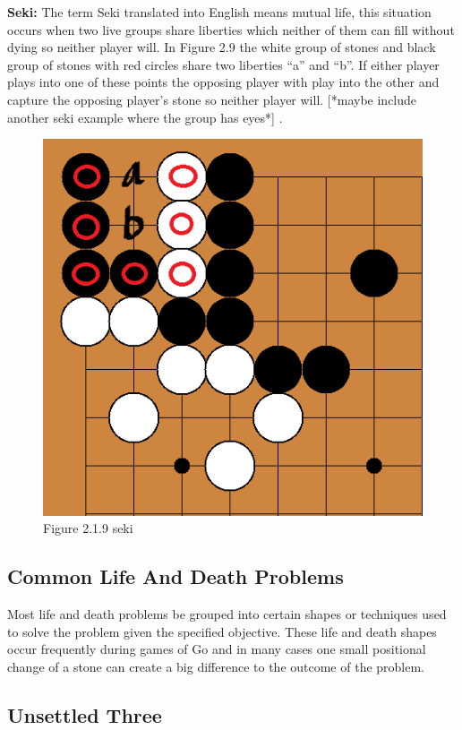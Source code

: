 \documentclass{l3proj}
\begin{document}
\textbf{Seki:} The term Seki translated into English means mutual life, this situation occurs when two live groups share liberties which neither of them can fill without dying so neither player will.
 In Figure 2.9 the white group of stones and black group of stones with red circles share two liberties “a” and “b”. If either player plays into one of these points the opposing player with play into the other and capture the opposing player’s stone so neither player will. [*maybe include another seki example where the group has eyes*] .

\begin{figure}[H]
\centering
\includegraphics[scale=0.5]{Images/seki.png}
\caption{Figure 2.1.9 seki}
\end{figure}

\subsection{Common Life And Death Problems}

Most life and death problems be grouped into certain shapes or techniques used to solve the problem given the specified objective. These life and death shapes occur frequently during games of Go and in many cases one small positional change of a stone can create a big difference to the outcome of the problem.

\subsection{Unsettled Three}
\end{document}
